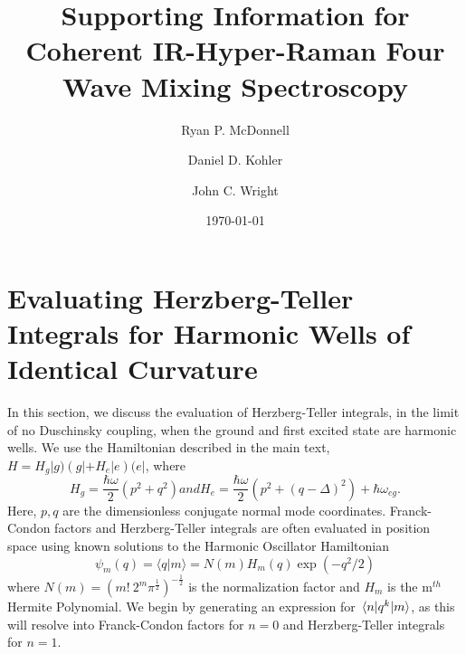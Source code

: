 \documentclass[aip, jcp, reprint, onecolumn, nofootinbib]{revtex4-2}
\begin{document}
\title{Supporting Information for Coherent IR-Hyper-Raman Four Wave Mixing Spectroscopy}


\author{Ryan P. McDonnell} 
\author{Daniel D. Kohler}
\author{John C. Wright} 


\date{\today}

\maketitle
\tableofcontents
\clearpage


\section{Evaluating Herzberg-Teller Integrals for Harmonic Wells of Identical Curvature}
In this section, we discuss the evaluation of Herzberg-Teller integrals, in the limit of no Duschinsky coupling, when the ground and first excited state are harmonic wells.
We use the Hamiltonian described in the main text, $H = H_g |g) \left(g| + H_e |e\right) (e|$, where
\begin{subequations}\label{Hamiltonian}
	\begin{equation}
		H_g = \frac{\hbar \omega }{2} \left(p^2 + q^2 \right)
	\end{equation}
	and
	\begin{equation}
		H_e = \frac{\hbar \omega }{2} \left(p^2 +  (q-\Delta)^2 \right) + \hbar \omega_{eg}.
	\end{equation}
\end{subequations}
Here, $p,q$ are the dimensionless conjugate normal mode coordinates.
Franck-Condon factors and Herzberg-Teller integrals are often evaluated in position space using known solutions to the Harmonic Oscillator Hamiltonian \cite{RN230}
\begin{equation}
	\psi_m(q) = \langle q | m \rangle = N(m) H_m(q) \exp(-q^2/2)
\end{equation}
where $N(m) = (m! \ 2^m \pi^{\frac{1}{2}})^{-\frac{1}{2}}$ is the normalization factor and $H_m$ is the m$^{th}$ Hermite Polynomial.
We begin by generating an expression for $\mel{n}{q^k}{m}$, as this will resolve into Franck-Condon factors for $n = 0$ and Herzberg-Teller integrals for $n=1$.
\end{document}
